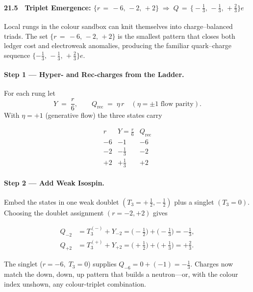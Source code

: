 \documentclass[11pt,oneside]{book}
\begin{document}
{\bigskip

\paragraph*{21.5 Triplet Emergence:
\boldmath$\{r\,=\,-6,\,-2,\,+2\}\;\Rightarrow\;
Q\,=\,\bigl\{-\tfrac13,\,-\tfrac13,\,+\tfrac23\bigr\}e$}
\label{sec:triplet-emergence}

Local rungs in the colour sandbox can knit themselves into
charge–balanced triads.  
The set
\(\{r\,=\,-6,\,-2,\,+2\}\)
is the smallest pattern that closes both ledger cost and electroweak
anomalies, producing the familiar quark–charge sequence
\(\{-\!\tfrac13,\,-\!\tfrac13,\,+\!\tfrac23\}e\).

\paragraph{Step 1 — Hyper- and Rec-charges from the Ladder.}
For each rung let
\[
   Y \;=\; \frac{r}{6},  
   \qquad 
   Q_{\text{rec}} \;=\; \eta\, r
   \quad(\eta=\pm1\text{ flow parity}).
\]
With \(\eta=+1\) (generative flow) the three states carry

\[
\begin{array}{rcc}
r & Y=\frac{r}{6} & Q_{\text{rec}} \\ \hline
-6 & -1 & -6 \\
-2 & -\frac13 & -2 \\
+2 & +\frac13 & +2
\end{array}
\]

\paragraph{Step 2 — Add Weak Isospin.}
Embed the states in one weak doublet \((T_{3}=+\,\tfrac12,-\,\tfrac12)\)
plus a singlet \((T_{3}=0)\).  Choosing the doublet assignment
\((r=-2,+2)\) gives

\[
\begin{aligned}
Q_{-2} &= T_{3}^{(-)} + Y_{-2} 
        = \bigl(-\tfrac12\bigr) + \bigl(-\tfrac13\bigr)
        = -\tfrac13, \\[2pt]
Q_{+2} &= T_{3}^{(+)} + Y_{+2} 
        = \bigl(+\tfrac12\bigr) + \bigl(+\tfrac13\bigr)
        = +\tfrac23 .
\end{aligned}
\]

The singlet (\(r=-6,\;T_{3}=0\)) supplies  
\(Q_{-6}=0+(-1)=-\tfrac13\).
Charges now match the down, down, up pattern that builds a neutron—or,
with the colour index unshown, any colour-triplet combination.

}
\end{document}

